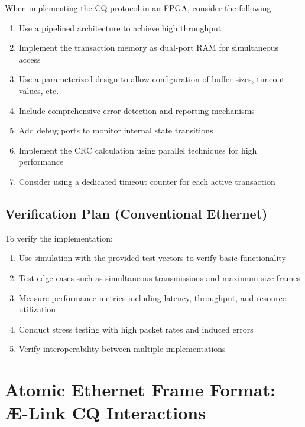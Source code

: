 \documentclass[../OAE-SPEC-MAIN.tex]{subfiles}
\begin{document}
When implementing the CQ protocol in an FPGA, consider the following:

\begin{enumerate}
    \item Use a pipelined architecture to achieve high throughput
    \item Implement the transaction memory as dual-port RAM for simultaneous access
    \item Use a parameterized design to allow configuration of buffer sizes, timeout values, etc.
    \item Include comprehensive error detection and reporting mechanisms
    \item Add debug ports to monitor internal state transitions
    \item Implement the CRC calculation using parallel techniques for high performance
    \item Consider using a dedicated timeout counter for each active transaction
\end{enumerate}

\subsection{Verification Plan (Conventional Ethernet)}

To verify the implementation:

\begin{enumerate}
    \item Use simulation with the provided test vectors to verify basic functionality
    \item Test edge cases such as simultaneous transmissions and maximum-size frames
    \item Measure performance metrics including latency, throughput, and resource utilization
    \item Conduct stress testing with high packet rates and induced errors
    \item Verify interoperability between multiple implementations
\end{enumerate}

\clearpage

\newpage
\section{Atomic Ethernet Frame Format: Æ-Link CQ Interactions}
\end{document}
